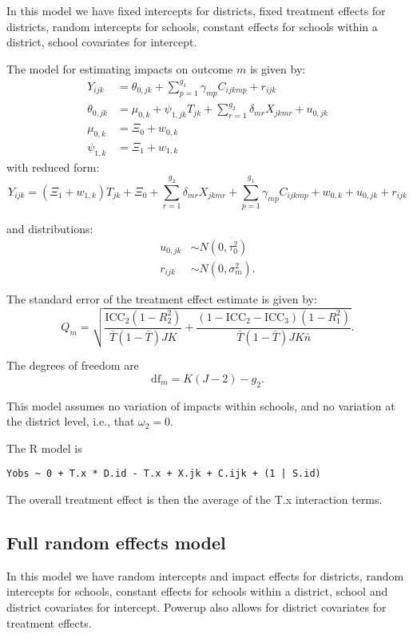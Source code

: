 \documentclass[]{article}
\begin{document}
In this model we have fixed intercepts for districts, fixed treatment
effects for districts, random intercepts for schools, constant effects
for schools within a district, school covariates for intercept.

The model for estimating impacts on outcome $m$ is given by: \[
\begin{aligned}
Y_{ijk} &=  \theta_{0,jk} + \sum_{p=1}^{g_{1}} \gamma_{mp} C_{ijkmp} + r_{ijk}\\
 \theta_{0,jk} &= \mu_{0,k} + \psi_{1,jk} T_{jk} + \sum_{r=1}^{g_{2}} \delta_{mr} X_{jkmr} + u_{0,jk}\\
 \mu_{0,k}  &= \Xi_{0}  + w_{0,k}\\
 \psi_{1,k} &= \Xi_{1} + w_{1,k}
\end{aligned}
\] with reduced form: \[
Y_{ijk} = \left(\Xi_{1} + w_{1,k} \right) T_{jk} + \Xi_{0} + \sum_{r=1}^{g_{2}} \delta_{mr} X_{jkmr} + \sum_{p=1}^{g_{1}} \gamma_{mp} C_{ijkmp}+ w_{0,k} + u_{0,jk} + r_{ijk}
\]

and distributions: \[
\begin{aligned}
u_{0,jk} &\sim N\left(0, \tau^2_{0}\right)\\
r_{ijk} &\sim N\left(0, \sigma^2_m\right).
\end{aligned}
\]

The standard error of the treatment effect estimate is given by: \[
Q_m = \sqrt{
\frac{\text{ICC}_{2}(1 - R^2_{2})}{\bar{T}(1 - \bar{T}) JK} +
\frac{(1-\text{ICC}_{2} - \text{ICC}_{3})(1-R^2_{1})}{\bar{T}(1 - \bar{T}) J K\bar{n}} }.
\]

The degrees of freedom are \[
\text{df}_m = K( J - 2) - g_{2}.
\]

This model assumes no variation of impacts within schools, and no
variation at the district level, i.e., that $\omega_2 = 0$.

The R model is

\begin{verbatim}
Yobs ~ 0 + T.x * D.id - T.x + X.jk + C.ijk + (1 | S.id)
\end{verbatim}

The overall treatment effect is then the average of the T.x interaction
terms.

\subsection{Full random effects model}\label{full-random-effects-model}

In this model we have random intercepts and impact effects for
districts, random intercepts for schools, constant effects for schools
within a district, school and district covariates for intercept. Powerup
also allows for district covariates for treatment effects.
\end{document}
